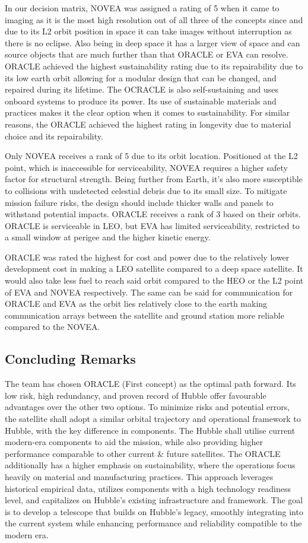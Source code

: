 In our decision matrix, NOVEA was assigned a rating of 5 when it came to imaging as it is the most high resolution out of all three of the concepts since and due to its L2 orbit position in space it can take images without interruption as there is no eclipse. Also being in deep space it has a larger view of space and can source objects that are much further than that ORACLE or EVA can resolve. ORACLE achieved the highest sustainability rating due to its repairability due to its low earth orbit allowing for a modular design that can be changed, and repaired during its lifetime. The OCRACLE is also self-sustaining and uses onboard systems to produce its power. Its use of sustainable materials and practices makes it the clear option when it comes to sustainability. 
For similar reasons, the ORACLE achieved the highest rating in longevity due to material choice and its repairability. 

Only NOVEA receives a rank of 5 due to its orbit location. Positioned at the L2 point, which is inaccessible for serviceability, NOVEA requires a higher safety factor for structural strength. Being further from Earth, it’s also more susceptible to collisions with undetected celestial debris due to its small size. To mitigate mission failure risks, the design should include thicker walls and panels to withstand potential impacts. ORACLE receives a rank of 3 based on their orbits. ORACLE is serviceable in LEO, but EVA has limited serviceability, restricted to a small window at perigee and the higher kinetic energy.


ORACLE was rated the highest for cost and power due to the relatively lower development cost in making a LEO satellite compared to a deep space satellite. It would also take less fuel to reach said orbit compared to the HEO or the L2 point of EVA and NOVEA respectively. The same can be said for communication for ORACLE and EVA as the orbit lies relatively close to the earth making communication arrays between the satellite and ground station more reliable compared to the NOVEA.

\subsection{Concluding Remarks}
The team has chosen ORACLE (First concept) as the optimal path forward. Its low risk, high redundancy, and proven record of Hubble offer favourable advantages over the other two options. To minimize risks and potential errors, the satellite shall adopt a similar orbital trajectory and operational framework to Hubble, with the key difference in components. The Hubble shall utilise current modern-era components to aid the mission, while also providing higher performance comparable to other current \& future satellites. The ORACLE additionally has a higher emphasis on sustainability, where the operations focus heavily on material and manufacturing practices. This approach leverages historical empirical data, utilizes components with a high technology readiness level, and capitalizes on Hubble’s existing infrastructure and framework. The goal is to develop a telescope that builds on Hubble’s legacy, smoothly integrating into the current system while enhancing performance and reliability compatible to the modern era.